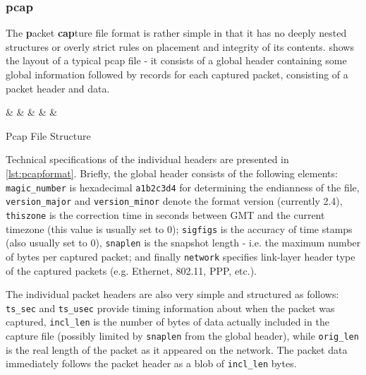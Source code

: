 \subsubsection{pcap}
\label{sec:formats:pcap}
The \textbf{p}acket \textbf{cap}ture file format is rather simple in that it has no deeply nested structures or
overly strict rules on placement and integrity of its contents.  shows the layout of a
typical pcap file - it consists of a global header containing some global information followed by records for
each captured packet, consisting of a packet header and data.

\begin{listing}[h]
\centering
\begin{bytefield}[boxformatting={\centering\tiny}]{32}
 &
 &
 &
 &
 &
\end{bytefield}
\caption{Pcap File Structure}
\label{lst:pcapfile}
\end{listing}

Technical specifications of the individual headers are presented in \cref{lst:pcapformat}. 
Briefly, the global header consists of the following elements:
\texttt{magic\_number} is hexadecimal \texttt{a1b2c3d4} for determining the endianness of the file,
\texttt{version\_major} and \texttt{version\_minor} denote the format version (currently 2.4),
\texttt{thiszone} is the correction time in seconds between GMT and the current timezone (this value is
usually set to 0); \texttt{sigfigs} is the accuracy of time stamps (also usually set to 0), \texttt{snaplen} is
the snapshot length - i.e. the maximum number of bytes per captured packet; and finally \texttt{network}
specifies link-layer header type of the captured packets (e.g. Ethernet, 802.11, PPP, etc.).

The individual packet headers are also very simple and structured as follows:
\texttt{ts\_sec} and \texttt{ts\_usec} provide timing information about when the packet was captured,
\texttt{incl\_len} is the number of bytes of data actually included in the capture file (possibly
limited by \texttt{snaplen} from the global header), while \texttt{orig\_len} is the
real length of the packet as it appeared on the network.
The packet data immediately follows the packet header as a blob of \texttt{incl\_len} bytes.



